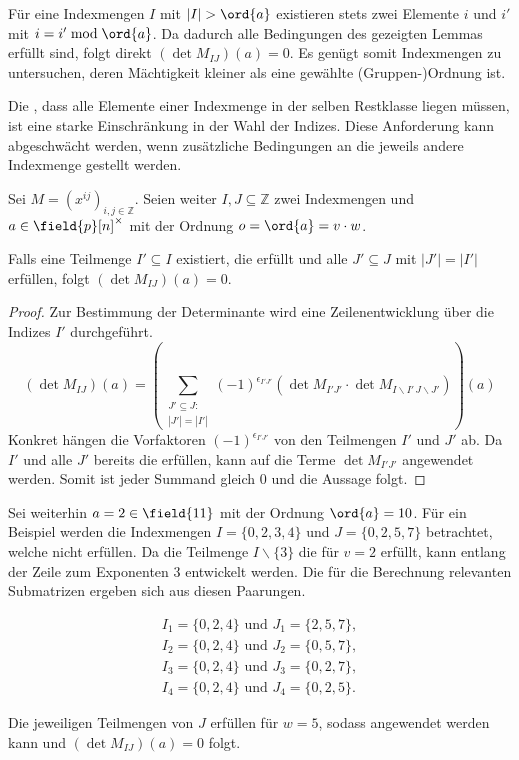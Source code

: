 {Für eine Indexmengen $I$ mit $|I| > \ord{a}$ existieren stets zwei Elemente $i$ und $i'$ mit $i = i' \bmod \ord{a}$. Da dadurch alle Bedingungen des gezeigten Lemmas erfüllt sind, folgt direkt $(\det M_{IJ})(a) = 0$. Es genügt somit Indexmengen zu untersuchen, deren Mächtigkeit kleiner als eine gewählte (Gruppen-)Ordnung ist.

Die , dass alle Elemente einer Indexmenge in der selben Restklasse liegen müssen, ist eine starke Einschränkung in der Wahl der Indizes. Diese Anforderung kann abgeschwächt werden, wenn zusätzliche Bedingungen an die jeweils andere Indexmenge gestellt werden.

\begin{satz} \label{satz:equal-columns-subs}
    Sei $M = \left( x^{ij} \right)_{i,j \in \mathbb{Z}}$. Seien weiter $I,J \subseteq \mathbb{Z}$ zwei Indexmengen und $a \in \field{p}[n]^\times$ mit der Ordnung $o = \ord{a} = v\cdot w$.

    Falls eine Teilmenge $I' \subseteq I$ existiert, die  erfüllt und alle $J' \subseteq J$ mit $|J'| = |I'|$  erfüllen, folgt $(\det M_{IJ})(a) = 0$.
\end{satz}

\begin{proof}
    Zur Bestimmung der Determinante wird eine Zeilenentwicklung über die Indizes $I'$ durchgeführt. 
\begin{equation*}
    (\det M_{IJ})(a) = \left( \sum_{\substack{J'\subseteq J:\\|J'| = |I'|}} (-1)^{\epsilon_{I'J'}} \left( \det M_{I'J'} \cdot \det M_{I\backslash I'\,J\backslash J'} \right) \right)(a) %
\end{equation*}
Konkret hängen die Vorfaktoren $(-1)^{\epsilon_{I'J'}}$ von den Teilmengen $I'$ und $J'$ ab. Da $I'$ und alle $J'$ bereits die  erfüllen, kann  auf die Terme $\det M_{I'J'}$ angewendet werden. Somit ist jeder Summand gleich $0$ und die Aussage folgt.
\end{proof}

Sei weiterhin $a = 2 \in \field{11}$ mit der Ordnung $\ord{a} = 10$. Für ein Beispiel werden die Indexmengen $I = \{0,2,3,4\}$ und $J = \{0,2,5,7\}$ betrachtet, welche  nicht erfüllen. Da die Teilmenge $I\backslash\{3\}$ die  für $v=2$ erfüllt, kann entlang der Zeile zum Exponenten $3$ entwickelt werden. Die für die Berechnung relevanten Submatrizen ergeben sich aus diesen Paarungen.

\begin{align*}
    I_1=\{0,2,4\} \text{ und } J_1=\{2,5,7\}, \\
    I_2=\{0,2,4\} \text{ und } J_2=\{0,5,7\}, \\
    I_3=\{0,2,4\} \text{ und } J_3=\{0,2,7\}, \\
    I_4=\{0,2,4\} \text{ und } J_4=\{0,2,5\}.
\end{align*}

Die jeweiligen Teilmengen von $J$ erfüllen  für $w=5$, sodass  angewendet werden kann und $(\det M_{IJ})(a) = 0$ folgt.
}

\begin{comment}
    Anstatt alle Teilmengen von $J$ einer bestimmten Kardinalität auf die Bedingung zu prüfen, kann auch das minimale $\gamma$ gesucht werden    
\end{comment}